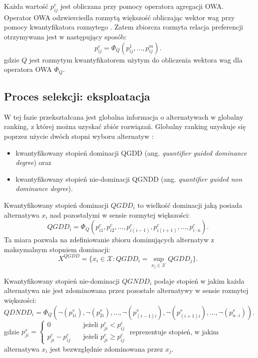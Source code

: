 Każda wartość $p^c_{ij}$ jest obliczana przy pomocy operatora agregacji OWA.
Operator OWA odzwierciedla rozmytą większość obliczając wektor wag przy pomocy
kwantyfikatora rozmytego \cite{Peneva2007}. Zatem zbiorcza rozmyta relacja
preferencji otrzymywana jest w następujący sposób:
\begin{equation}
p^c_{ij} = \Phi_Q(p^1_{ij}, \dotsc, p^m_{ij}).
\end{equation}
gdzie $Q$ jest rozmytym kwantyfikatorem użytym do obliczenia wektora wag dla
operatora OWA $\Phi_Q$.

\subsection{Proces selekcji: eksploatacja}
W tej fazie przekształcana jest globalna informacja o alternatywach w globalny
ranking, z której można uzyskać zbiór rozwiązań. Globalny ranking uzyskuje się
poprzez użycie dwóch stopni wyboru alternatyw
\cite{Herrera1996a,Campanella2011}:
\begin{itemize}
  \item kwantyfikowany stopień dominacji QGDD (ang. \textit{quantifier guided
  dominance degree}) oraz
  \item kwantyfikowany stopień nie-dominacji QGNDD (ang. \textit{quantifier
  guided non dominance degree}).
\end{itemize}

Kwantyfikowany stopień dominacji $QGDD_i$ to wielkość dominacji jaką posiada
alternatywa $x_i$ nad pozostałymi w sensie rozmytej większości:
\begin{equation}
QGDD_i = \Phi_Q(p^c_{i1}, p^c_{i2}, \dotsc, p^c_{i(i-1)},p^c_{i(i+1)}, \dotsc,
p^c_{i \cdot n}).
\end{equation}
Ta miara pozwala na zdefiniowanie zbioru dominujących alternatyw z maksymalnym
stopniem dominacji:
\begin{equation}
X^{QGDD} = \{ x_i \in \mathcal{X} : QGDD_i = \sup_{x_j \in \mathcal{X}} QGDD_j
\}.
\end{equation}

Kwantyfikowany stopień nie-dominacji $QGNDD_i$ podaje stopień w jakim każda
alternatywa nie jest zdominowana przez pozostałe alternatywy w sensie rozmytej
większości:
\begin{equation}
QDNDD_i = \Phi_Q(\neg(p^s_{1i}), \neg(p^s_{2i}), \dotsc,
\neg(p^s_{(i-1)i}), \neg(p^s_{(i+1)i}), \dotsc, \neg(p^s_{n \cdot i})).
\end{equation}
gdzie
$p^s_{ji} = 
  \left\{ 
	\begin{array}{ll}
	  0 				  & \quad \textrm{jeżeli } p^c_{ji} < p^c_{ij} \\
      p^c_{ji} - p^c_{ij} & \quad \textrm{jeżeli } p^c_{ji} \geq p^c_{ij}
  	\end{array} 
  \right.
$
reprezentuje stopień, w jakim alternatywa $x_i$ jest bezwzględnie zdominowana
przez $x_j$.

